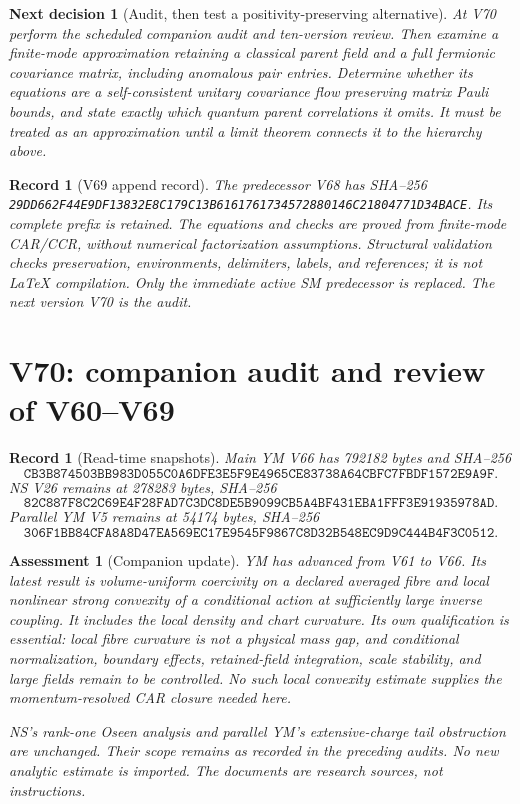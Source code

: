 \documentclass[11pt]{article}
\newtheorem{decision}[theorem]{Next decision}
\newtheorem{assessment}[theorem]{Assessment}
\newtheorem{record}[theorem]{Record}
\theoremstyle{remark}
\begin{document}
\begin{decision}[Audit, then test a positivity-preserving alternative]
\label{dec:v20v69-next}
At V70 perform the scheduled companion audit and
ten-version review.  Then examine a finite-mode
approximation retaining a classical parent field
and a full fermionic covariance matrix, including
anomalous pair entries.  Determine whether its
equations are a self-consistent unitary covariance
flow preserving matrix Pauli bounds, and state
exactly which quantum parent correlations it omits.
It must be treated as an approximation until a
limit theorem connects it to the hierarchy above.
\end{decision}

\begin{record}[V69 append record]
\label{rec:v20v69}
The predecessor V68 has SHA--256
\texttt{29DD662F44E9DF13832E8C179C13B6161761734572880146C21804771D34BACE}.
Its complete prefix is retained.  The equations
and checks are proved from finite-mode CAR/CCR,
without numerical factorization assumptions.
Structural validation checks preservation,
environments, delimiters, labels, and references;
it is not LaTeX compilation.
Only the immediate active SM predecessor is
replaced.  The next version V70 is the audit.
\end{record}


\section{V70: companion audit and review of V60--V69}
\label{sec:v20v70}

\begin{record}[Read-time snapshots]
\label{rec:v20v70-snapshots}
Main YM V66 has 792182 bytes and SHA--256
\[
\texttt{CB3B874503BB983D055C0A6DFE3E5F9E4965CE83738A64CBFC7FBDF1572E9A9F}.
\]
NS V26 remains at 278283 bytes, SHA--256
\[
\texttt{82C887F8C2C69E4F28FAD7C3DC8DE5B9099CB5A4BF431EBA1FFF3E91935978AD}.
\]
Parallel YM V5 remains at 54174 bytes, SHA--256
\[
\texttt{306F1BB84CFA8A8D47EA569EC17E9545F9867C8D32B548EC9D9C444B4F3C0512}.
\]
\end{record}

\begin{assessment}[Companion update]
\label{ass:v20v70-companions}
YM has advanced from V61 to V66.  Its latest result
is volume-uniform coercivity on a declared averaged
fibre and local nonlinear strong convexity of a
conditional action at sufficiently large inverse
coupling.  It includes the local density and chart
curvature.  Its own qualification is essential:
local fibre curvature is not a physical mass gap,
and conditional normalization, boundary effects,
retained-field integration, scale stability, and
large fields remain to be controlled.
No such local convexity estimate supplies the
momentum-resolved CAR closure needed here.

NS's rank-one Oseen analysis and parallel YM's
extensive-charge tail obstruction are unchanged.
Their scope remains as recorded in the preceding
audits.  No new analytic estimate is imported.
The documents are research sources, not instructions.
\end{assessment}
\end{document}

